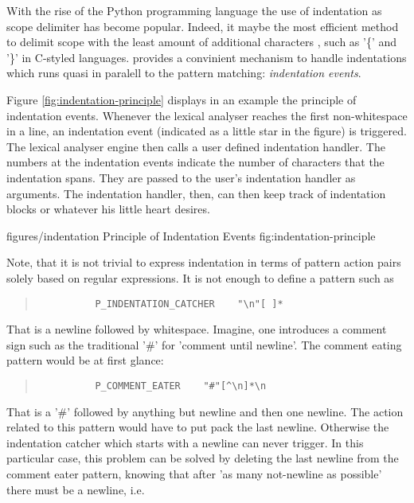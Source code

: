 With the rise of the Python programming language the use of indentation as
scope delimiter has become popular. Indeed, it maybe the most efficient method
to delimit scope with the least amount of additional characters
\cite{Safer2004}, such as '\{' and '\}' in C-styled languages.  {\Quex}
provides a convinient mechanism to handle indentations which runs quasi in
paralell to the pattern matching: {\it indentation events}.  

Figure \ref{fig:indentation-principle} displays in an example the principle of
indentation events. Whenever the lexical analyser reaches the first
non-whitespace in a line, an indentation event (indicated as a little star in
the figure) is triggered. The lexical analyser engine then calls a user
defined indentation handler. The numbers at the indentation events indicate
the number of characters that the indentation spans. They are passed to the
user's indentation handler as arguments. The indentation handler, then, can
then keep track of indentation blocks or whatever his little heart desires.


\showpic
{figures/indentation}
{Principle of Indentation Events}
{fig:indentation-principle}

Note, that it is not trivial to express indentation in terms of pattern action
pairs solely based on regular expressions. It is not enough to define a
pattern such as 

\begin{quote}
  \begin{verbatim}
          P_INDENTATION_CATCHER    "\n"[ ]*
  \end{verbatim}
\end{quote}

That is a newline followed by whitespace. Imagine, one introduces a comment
sign such as the traditional '\#' for 'comment until newline'. The comment
eating pattern would be at first glance:

\begin{quote}
  \begin{verbatim}
          P_COMMENT_EATER    "#"[^\n]*\n
  \end{verbatim}
\end{quote}

That is a '\#' followed by anything but newline and then one newline. The
action related to this pattern would have to put pack the last newline.
Otherwise the indentation catcher which starts with a newline can never
trigger. In this particular case, this problem can be solved by deleting the
last newline from the comment eater pattern, knowing that after 'as many
not-newline as possible' there must be a newline, i.e.

